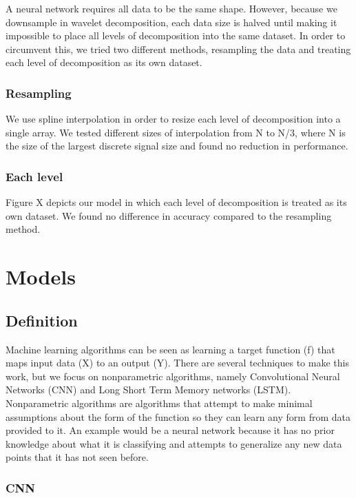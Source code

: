 \documentclass{turabian-thesis}
\begin{document}
A neural network requires all data to be the same shape. However, because we downsample in wavelet decomposition, each data size is halved until making it impossible to place all levels of decomposition into the same dataset. In order to circumvent this, we tried two different methods, resampling the data and treating each level of decomposition as its own dataset.


\subsection{Resampling}

We use spline interpolation in order to resize each level of decomposition into a single array. We tested different sizes of interpolation from N to N/3, where N is the size of the largest discrete signal size and found no reduction in performance.

\subsection{Each level}
Figure {X} depicts our model in which each level of decomposition is treated as its own dataset. We found no difference in accuracy compared to the resampling method. 

\chapter{Models}


\section{Definition}
Machine learning algorithms can be seen as learning a target function (f) that maps input data (X) to an output (Y). There are several techniques to make this work, but we focus on nonparametric algorithms, namely Convolutional Neural Networks (CNN) and Long Short Term Memory networks (LSTM). Nonparametric algorithms are algorithms that attempt to make minimal assumptions about the form of the function so they can learn any form from data provided to it. An example would be a neural network because it has no prior knowledge about what it is classifying and attempts to generalize any new data points that it has not seen before.

\subsection{CNN}
\end{document}
